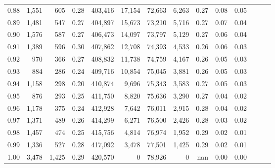 \begin{tabular}{rrrrrrrrrrrrrr}
0.88 &   1,551 &    605 &  0.28 &  403,416 &   17,154 &  72,663 &   6,263 &  0.27 &  0.08 &      0.05 \\
0.89 &   1,481 &    547 &  0.27 &  404,897 &   15,673 &  73,210 &   5,716 &  0.27 &  0.07 &      0.04 \\
0.90 &   1,576 &    587 &  0.27 &  406,473 &   14,097 &  73,797 &   5,129 &  0.27 &  0.06 &      0.04 \\
0.91 &   1,389 &    596 &  0.30 &  407,862 &   12,708 &  74,393 &   4,533 &  0.26 &  0.06 &      0.03 \\
0.92 &     970 &    366 &  0.27 &  408,832 &   11,738 &  74,759 &   4,167 &  0.26 &  0.05 &      0.03 \\
0.93 &     884 &    286 &  0.24 &  409,716 &   10,854 &  75,045 &   3,881 &  0.26 &  0.05 &      0.03 \\
0.94 &   1,158 &    298 &  0.20 &  410,874 &    9,696 &  75,343 &   3,583 &  0.27 &  0.05 &      0.03 \\
0.95 &     876 &    293 &  0.25 &  411,750 &    8,820 &  75,636 &   3,290 &  0.27 &  0.04 &      0.02 \\
0.96 &   1,178 &    375 &  0.24 &  412,928 &    7,642 &  76,011 &   2,915 &  0.28 &  0.04 &      0.02 \\
0.97 &   1,371 &    489 &  0.26 &  414,299 &    6,271 &  76,500 &   2,426 &  0.28 &  0.03 &      0.02 \\
0.98 &   1,457 &    474 &  0.25 &  415,756 &    4,814 &  76,974 &   1,952 &  0.29 &  0.02 &      0.01 \\
0.99 &   1,336 &    527 &  0.28 &  417,092 &    3,478 &  77,501 &   1,425 &  0.29 &  0.02 &      0.01 \\
1.00 &   3,478 &  1,425 &  0.29 &  420,570 &        0 &  78,926 &       0 &   nan &  0.00 &      0.00 \\
\bottomrule
\end{tabular}
